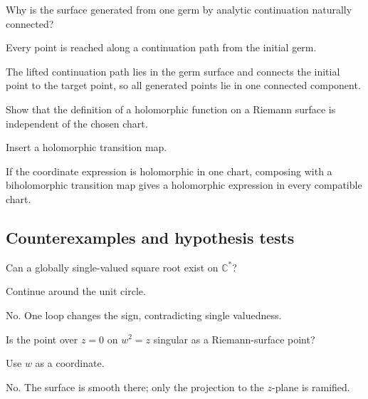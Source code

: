 \begin{exercise}\label{exr:iv22-expand-08}
Why is the surface generated from one germ by analytic continuation naturally connected?
\end{exercise}
\begin{hint}
Every point is reached along a continuation path from the initial germ.
\end{hint}
\begin{solution}
The lifted continuation path lies in the germ surface and connects the initial point to the target point, so all generated points lie in one connected component.
\end{solution}

\begin{exercise}\label{exr:iv22-expand-09}
Show that the definition of a holomorphic function on a Riemann surface is independent of the chosen chart.
\end{exercise}
\begin{hint}
Insert a holomorphic transition map.
\end{hint}
\begin{solution}
If the coordinate expression is holomorphic in one chart, composing with a biholomorphic transition map gives a holomorphic expression in every compatible chart.
\end{solution}

\subsection*{Counterexamples and hypothesis tests}

\begin{exercise}\label{exr:iv22-expand-10}
Can a globally single-valued square root exist on \(\mathbb C^*\)?
\end{exercise}
\begin{hint}
Continue around the unit circle.
\end{hint}
\begin{solution}
No. One loop changes the sign, contradicting single valuedness.
\end{solution}

\begin{exercise}\label{exr:iv22-expand-11}
Is the point over \(z=0\) on \(w^2=z\) singular as a Riemann-surface point?
\end{exercise}
\begin{hint}
Use \(w\) as a coordinate.
\end{hint}
\begin{solution}
No. The surface is smooth there; only the projection to the \(z\)-plane is ramified.
\end{solution}

